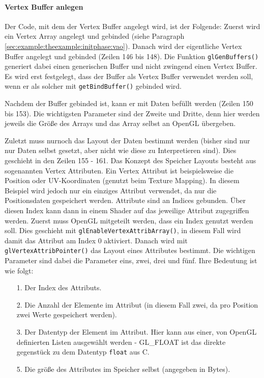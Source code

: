 \paragraph{Vertex Buffer anlegen}
\label{sec:example:theexample:initphase:createbuffer}
Der Code, mit dem der Vertex Buffer angelegt wird, ist der Folgende:
Zuerst wird ein Vertex Array angelegt und gebinded (siehe Paragraph \ref{sec:example:theexample:initphase:vao}). Danach wird der eigentliche Vertex Buffer angelegt und gebinded (Zeilen 146 bis 148). Die Funktion \texttt{glGenBuffers()} generiert dabei einen generischen Buffer und nicht zwingend einen Vertex Buffer. Es wird erst festgelegt, dass der Buffer als Vertex Buffer verwendet werden soll, wenn er als solcher mit \texttt{getBindBuffer()} gebinded wird.

Nachdem der Buffer gebinded ist, kann er mit Daten befüllt werden (Zeilen 150 bis 153). Die wichtigsten Parameter sind der Zweite und Dritte, denn hier werden jeweils die Größe des Arrays und das Array selbst an OpenGL übergeben.

Zuletzt muss nurnoch das Layout der Daten bestimmt werden (bisher sind nur nur Daten selbst gesetzt, aber nicht wie diese zu Interpretieren sind). Dies geschieht in den Zeilen 155 - 161. 
Das Konzept des Speicher Layouts besteht aus sogenannten Vertex Attributen. Ein Vertex Attribut ist beispielsweise die Position oder UV-Koordinaten (genutzt beim Texture Mapping). In diesem Beispiel wird jedoch nur ein einziges Attribut verwendet, da nur die Positionsdaten gespeichert werden. Attribute sind an Indices gebunden. Über diesen Index kann dann in einem Shader auf das jeweilige Attribut zugegriffen werden. Zuerst muss OpenGL mitgeteilt werden, dass ein Index genutzt werden soll. Dies geschieht mit \texttt{glEnableVertexAttribArray()}, in diesem Fall wird damit das Attribut am Index $0$ aktiviert. Danach wird mit \texttt{glVertexAttribPointer()} das Layout eines Attributes bestimmt. Die wichtigen Parameter sind dabei die Parameter eins, zwei, drei und fünf. Ihre Bedeutung ist wie folgt:

\begin{enumerate}
    \item [1.] Der Index des Attributs.
    \item [2.] Die Anzahl der Elemente im Attribut (in diesem Fall zwei, da pro Position zwei Werte gespeichert werden).
    \item [3.] Der Datentyp der Element im Attribut. Hier kann aus einer, von OpenGL definierten Listen ausgewählt werden - GL\_FLOAT ist das direkte gegenstück zu dem Datentyp \texttt{float} aus C.
    \item [5.] Die größe des Attributes im Speicher selbst (angegeben in Bytes).
\end{enumerate}

